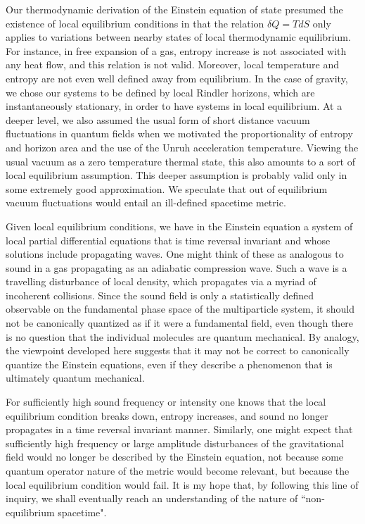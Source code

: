 Our thermodynamic derivation of the Einstein equation of state
presumed the existence of local equilibrium conditions
in that the relation $\delta Q=T dS$ only applies
to variations between nearby states of local thermodynamic
equilibrium. For instance, in free expansion of a gas, entropy
increase is not associated with any heat flow, and this relation
is not valid. Moreover, local temperature and entropy are not
 even well defined away from equilibrium.
In the case of gravity, we chose our systems to be defined by
local Rindler horizons, which are instantaneously stationary, in
order to have systems in local equilibrium.
At a deeper level, we also assumed the usual form of short
distance vacuum fluctuations in quantum fields when we motivated
the proportionality of entropy and horizon area and the use of
the Unruh acceleration temperature.
Viewing the usual vacuum as a zero temperature thermal
state\cite{sciama}, this also amounts to a sort of local
equilibrium assumption. This deeper
assumption is probably valid only in some extremely good approximation.
We speculate that out of equilibrium vacuum fluctuations
would entail an ill-defined spacetime metric.

Given local equilibrium conditions, we have in the Einstein equation
a system of local partial differential equations that is time reversal
invariant and whose solutions include propagating waves. One might think of
these as analogous to sound in a gas propagating as an adiabatic
compression wave. Such a wave is a travelling disturbance
of local density, which propagates via a myriad of incoherent collisions.
Since the sound field is only a statistically defined observable
on the fundamental phase space of the multiparticle system,
it should not be canonically quantized as if it were a fundamental
field, even though there
is no question that the individual molecules are quantum mechanical.
By analogy, the viewpoint developed here suggests that it may
not be correct to canonically quantize the Einstein equations,
even if they describe a phenomenon that is ultimately quantum mechanical.

For sufficiently high sound frequency or intensity one knows that
the local equilibrium condition breaks down, entropy increases,
and sound no longer propagates in a time reversal invariant manner.
Similarly, one might expect that sufficiently high frequency or
large amplitude disturbances of the gravitational field would
no longer be described by the Einstein equation, not because
some quantum operator nature of the metric would become relevant,
but because the local equilibrium condition would fail.
It is my hope that, by following this line of inquiry, we
shall eventually reach an understanding
of  the nature of ``non-equilibrium spacetime".

